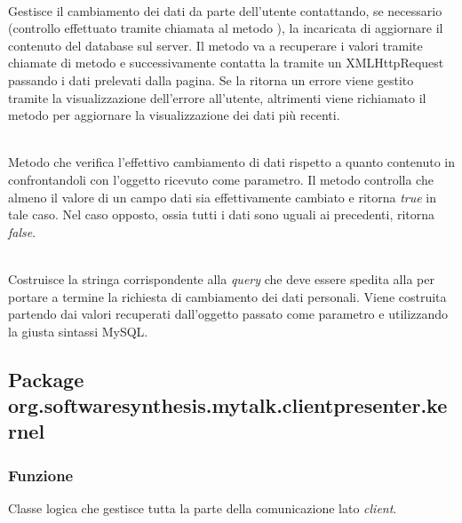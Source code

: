 \begin{description}
\item{}\\
Gestisce il cambiamento dei dati da parte dell'utente contattando, se necessario (controllo effettuato tramite chiamata al metodo ), la  incaricata di aggiornare il contenuto del database sul server. Il metodo va a recuperare i valori tramite chiamate di metodo  e successivamente contatta la  tramite un XMLHttpRequest passando i dati prelevati dalla pagina. Se la  ritorna un errore viene gestito tramite la visualizzazione dell'errore all'utente, altrimenti viene richiamato il metodo  per aggiornare la visualizzazione dei dati più recenti.

\item{}\\
Metodo che verifica l'effettivo cambiamento di dati rispetto a quanto contenuto in\\  confrontandoli con l'oggetto  ricevuto come parametro. Il metodo controlla che almeno il valore di un campo dati sia effettivamente cambiato e ritorna \textit{true} in tale caso. Nel caso opposto, ossia tutti i dati sono uguali ai precedenti, ritorna \textit{false}.

\item{}\\
Costruisce la stringa corrispondente alla \textit{query} che deve essere spedita alla  per portare a termine la richiesta di cambiamento dei dati personali. Viene costruita partendo dai valori recuperati dall'oggetto  passato come parametro e utilizzando la giusta sintassi MySQL.

\end{description}

\subsection{Package org.softwaresynthesis.mytalk.clientpresenter.kernel}\label{sec:kernel}

\subsubsection*{Funzione}
Classe logica che gestisce tutta la parte della comunicazione lato \textit{client}.


